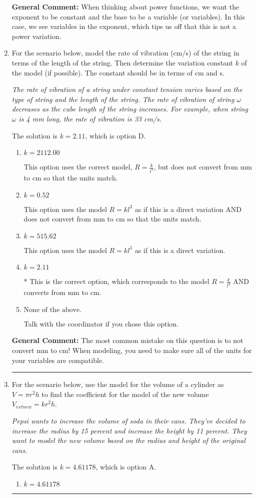 \documentclass{extbook}[14pt]
\newcommand{\litem}[1]{\item #1

\rule{\textwidth}{0.4pt}}
\begin{document}
\begin{enumerate}
{\textbf{General Comment:} When thinking about power functions, we want the exponent to be constant and the base to be a variable (or variables). In this case, we see variables in the exponent, which tips us off that this is not a power variation.
}
\litem{
For the scenario below, model the rate of vibration (cm/s) of the string in terms of the length of the string. Then determine the variation constant $k$ of the model (if possible). The constant should be in terms of cm and s.

\begin{center}
    \textit{ The rate of vibration of a string under constant tension varies based on the type of string and the length of the string. The rate of vibration of string $\omega$ decreases as the cube length of the string increases. For example, when string $\omega$ is 4 mm long, the rate of vibration is 33 cm/s. }
\end{center}
The solution is \( k = 2.11 \), which is option D.\begin{enumerate}[label=\Alph*.]
\item \( k = 2112.00 \)

This option uses the correct model, $R = \frac{k}{l^{3}}$, but does not convert from mm to cm so that the units match.
\item \( k = 0.52 \)

This option uses the model $R = kl^{3}$ as if this is a direct variation AND does not convert from mm to cm so that the units match.
\item \( k = 515.62 \)

This option uses the model $R = kl^{3}$ as if this is a direct variation.
\item \( k = 2.11 \)

* This is the correct option, which corresponds to the model $R = \frac{k}{l^{3}}$ AND converts from mm to cm.
\item \( \text{None of the above.} \)

Talk with the coordinator if you chose this option.
\end{enumerate}

\textbf{General Comment:} The most common mistake on this question is to not convert mm to cm! When modeling, you need to make sure all of the units for your variables are compatible.
}
\litem{
For the scenario below, use the model for the volume of a cylinder as $V = \pi r^2 h$ to find the coefficient for the model of the new volume $V_{	ext{new}} = k r^2 h$.

\begin{center}
    \textit{ Pepsi wants to increase the volume of soda in their cans. They've decided to increase the radius by 15 percent and increase the height by 11 percent. They want to model the new volume based on the radius and height of the original cans. }
\end{center}
The solution is \( k = 4.61178 \), which is option A.\begin{enumerate}[label=\Alph*.]
\item \( k = 4.61178 \)


\end{enumerate}}
\end{enumerate}
\end{document}

